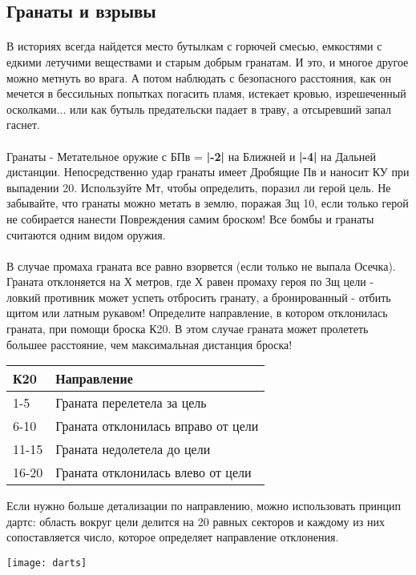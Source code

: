 \subsection{Гранаты и взрывы}
\paragraph{}
В историях всегда найдется место бутылкам с горючей смесью, емкостями с едкими летучими веществами и старым добрым гранатам. И это, и многое другое можно метнуть во врага. А потом наблюдать с безопасного расстояния, как он мечется в бессильных попытках погасить пламя, истекает кровью, изрешеченный осколками... или как бутыль предательски падает в траву, а отсыревший запал гаснет.
\paragraph{}
Гранаты - Метательное оружие с БПв = \textbf{|-2|} на Ближней и \textbf{|-4|} на Дальней дистанции. Непосредственно удар гранаты имеет Дробящие Пв и наносит КУ при выпадении 20. Используйте Мт, чтобы определить, поразил ли герой цель. Не забывайте, что гранаты можно метать в землю, поражая Зщ 10, если только герой не собирается нанести Повреждения самим броском!
\newline
Все бомбы и гранаты считаются одним видом оружия.
\paragraph{}
В случае промаха граната все равно взорвется (если только не выпала Осечка). Граната отклоняется на Х метров, где Х равен промаху героя по Зщ цели - ловкий противник может успеть отбросить гранату, а бронированный - отбить щитом или латным рукавом! Определите направление, в котором отклонилась граната, при помощи броска К20. В этом случае граната может пролететь большее расстояние, чем максимальная дистанция броска!
\begin{center}
\begin{tabular}{ |p{2.7cm}|p{12cm}| }
\hline
\textbf{К20} & \textbf{Направление}
\\ \hline
1-5 & Граната перелетела за цель
\\ \hline
6-10 & Граната отклонилась вправо от цели
\\ \hline
11-15 & Граната недолетела до цели
\\ \hline
16-20 & Граната отклонилась влево от цели
\\ \hline
\end{tabular}
\end{center}
\begin{tcolorbox}
Если нужно больше детализации по направлению, можно использовать принцип дартс: область вокруг цели делится на 20 равных секторов и каждому из них сопоставляется число, которое определяет направление отклонения.
\newline
\begin{center}
\texttt{[image: darts]}
\end{center}
\end{tcolorbox}
